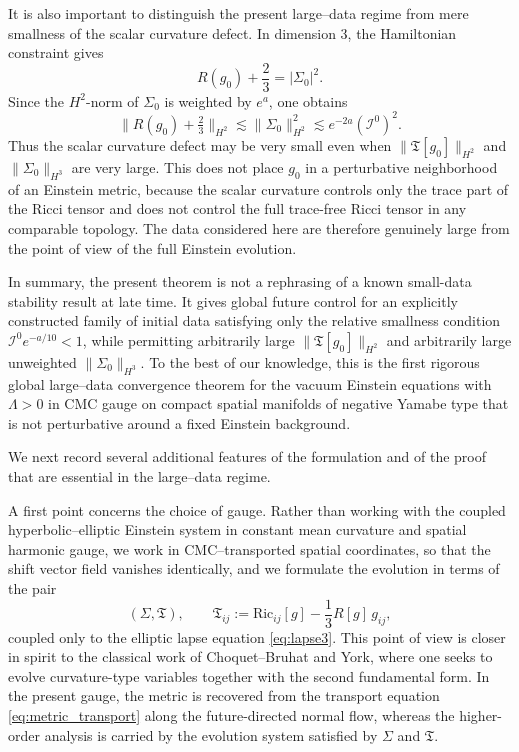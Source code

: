 \documentclass{amsart}
\begin{document}
\noindent It is also important to distinguish the present large--data regime from mere smallness of
the scalar curvature defect.  In dimension \(3\), the Hamiltonian constraint gives
\[
R(g_{0})+\frac{2}{3}=|\Sigma_{0}|^{2}.
\]
Since the \(H^{2}\)-norm of \(\Sigma_{0}\) is weighted by \(e^{a}\), one obtains
\[
\|R(g_{0})+\tfrac23\|_{H^{2}}
\lesssim
\|\Sigma_{0}\|_{H^{2}}^{2}
\lesssim
e^{-2a}(\mathcal I^{0})^{2}.
\]
\noindent Thus the scalar curvature defect may be very small even when
\(\|\mathfrak T[g_{0}]\|_{H^{2}}\) and \(\|\Sigma_{0}\|_{H^{3}}\) are very large.  This does not
place \(g_{0}\) in a perturbative neighborhood of an Einstein metric, because the scalar
curvature controls only the trace part of the Ricci tensor and does not control the full
trace-free Ricci tensor in any comparable topology.  The data considered here are
therefore genuinely large from the point of view of the full Einstein evolution.

\noindent In summary, the present theorem is not a rephrasing of a known small-data stability
result at late time.  It gives global future control for an explicitly constructed family of
initial data satisfying only the relative smallness condition
\(\mathcal I^{0}e^{-a/10}<1\), while permitting arbitrarily large
\(\|\mathfrak T[g_{0}]\|_{H^{2}}\) and arbitrarily large unweighted
\(\|\Sigma_{0}\|_{H^{3}}\).  To the best of our knowledge, this is the first rigorous global
large--data convergence theorem for the vacuum Einstein equations with
\(\Lambda>0\) in CMC gauge on compact spatial manifolds of negative Yamabe type that is
not perturbative around a fixed Einstein background.
  


\noindent We next record several additional features of the formulation and of the proof that are essential in the large--data regime.

\medskip

\noindent A first point concerns the choice of gauge.  Rather than working with the coupled hyperbolic--elliptic Einstein system in constant mean curvature and spatial harmonic gauge, we work in CMC--transported spatial coordinates, so that the shift vector field vanishes identically, and we formulate the evolution in terms of the pair
\[
(\Sigma,\mathfrak T),\qquad
\mathfrak T_{ij}:=\text{Ric}_{ij}[g]-\frac13 R[g]\,g_{ij},
\]
coupled only to the elliptic lapse equation \eqref{eq:lapse3}.  This point of view is closer in spirit to the classical work of Choquet--Bruhat and York, where one seeks to evolve curvature-type variables together with the second fundamental form.  In the present gauge, the metric is recovered from the transport equation \eqref{eq:metric_transport} along the future-directed normal flow, whereas the higher-order analysis is carried by the evolution system satisfied by \(\Sigma\) and \(\mathfrak T\).
\end{document}
